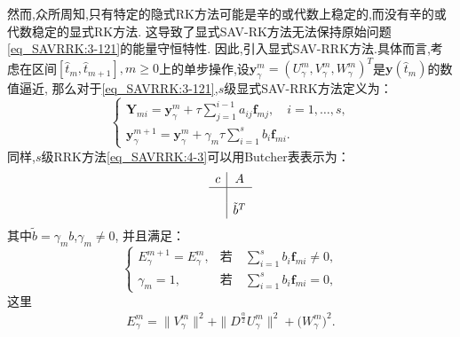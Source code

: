 然而,众所周知,只有特定的隐式RK方法可能是辛的或代数上稳定的,而没有辛的或代数稳定的显式RK方法.
这导致了显式SAV-RK方法无法保持原始问题\eqref{eq_SAVRRK:3-121}的能量守恒特性.
因此,引入显式SAV-RRK方法.具体而言,考虑在区间$\left[\hat{t}_m, \hat{t}_{m+1}\right], m \geq 0$上的单步操作,设$\bm{y}_\gamma^m=\left(U^{m}_{\gamma},V^{m}_{\gamma},W^{m}_{\gamma}\right)^T$是$\bm{y}\left(\hat{t}_m\right)$的数值逼近,
那么对于\eqref{eq_SAVRRK:3-121},$s$级显式SAV-RRK方法定义为：
\begin{equation}
\left\{\begin{array}{l}
\bm{Y}_{m i}=\bm{y}_\gamma^m+\tau \sum\limits_{j=1}^{i-1} a_{i j} \bm{f}_{m j}, \quad i=1, \ldots, s, \\
\bm{y}_\gamma^{m+1}=\bm{y}_\gamma^m+\gamma_m \tau \sum\limits_{i=1}^s b_i \bm{f}_{m i}.
\end{array}\right.\label{eq_SAVRRK:4-3}
\end{equation}
同样,$s$级RRK方法\eqref{eq_SAVRRK:4-3}可以用Butcher表表示为：
\begin{equation}
\begin{array}{c|c}
c & A \\
\hline \\
& \tilde{b}^T
\end{array}
\end{equation}
其中$\tilde{b}=\gamma_m b$,$\gamma_m\neq 0$, 并且满足：
\begin{equation}
\left\{\begin{array}{ll}
E_{\gamma}^{m+1}=E_{\gamma}^{m}, & \text{若} \quad  \sum\limits_{i=1}^s b_i \bm{f}_{m i} \neq 0,\\
\gamma_m=1, & \text{若} \quad  \sum\limits_{i=1}^s b_i \bm{f}_{m i} =0,
\end{array}\right.\label{eq_SAVRRK:4-6}
\end{equation}
这里
\begin{align}\label{eq_SAVRRK:4-6b}
E_{\gamma}^{m}  =\|V_{\gamma}^{m}\|^2+\|D^\frac{\alpha}{2} U_{\gamma}^{m}\|^2+\big(W_{\gamma}^{m}\big)^2.
\end{align}

